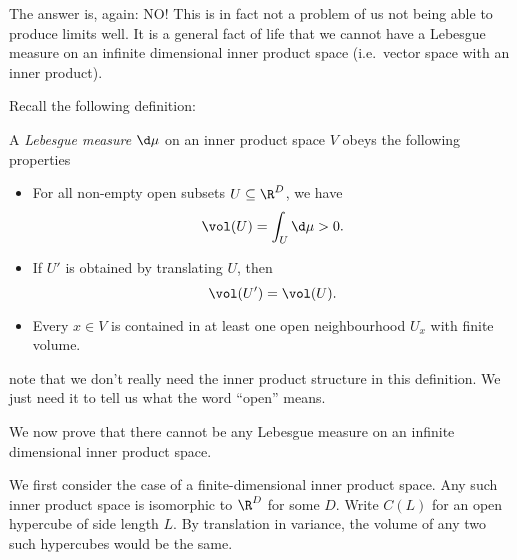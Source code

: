 \documentclass[a4paper]{article}
\begin{document}
The answer is, again: NO! This is in fact not a problem of us not being able to produce limits well. It is a general fact of life that we cannot have a Lebesgue measure on an infinite dimensional inner product space (i.e.\ vector space with an inner product).

Recall the following definition:
\begin{defi}
  A \emph{Lebesgue measure} $\d \mu$ on an inner product space $V$ obeys the following properties
  \begin{itemize}
    \item For all non-empty open subsets $U \subseteq \R^D$, we have
      \[
        \vol(U) = \int_U \d \mu > 0.
      \]
    \item If $U'$ is obtained by translating $U$, then
      \[
        \vol(U') = \vol(U).
      \]
    \item Every $x \in V$ is contained in at least one open neighbourhood $U_x$ with finite volume.
  \end{itemize}
\end{defi}
note that we don't really need the inner product structure in this definition. We just need it to tell us what the word ``open'' means.

We now prove that there cannot be any Lebesgue measure on an infinite dimensional inner product space.

We first consider the case of a finite-dimensional inner product space. Any such inner product space is isomorphic to $\R^D$ for some $D$. Write $C(L)$ for an open hypercube of side length $L$. By translation in variance, the volume of any two such hypercubes would be the same.
\end{document}
